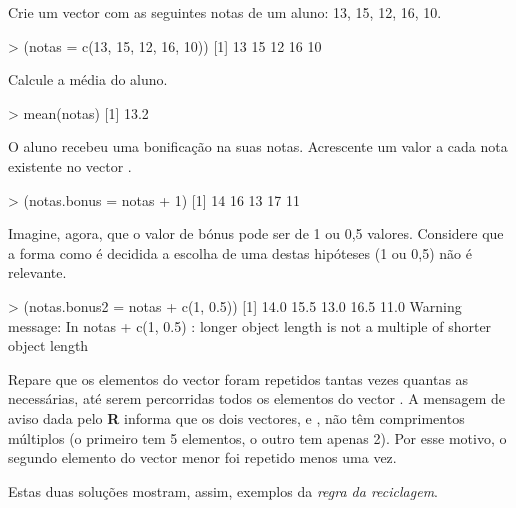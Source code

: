 \documentclass{exam}
\begin{document}
\begin{questions}

\question Crie um vector  com as seguintes notas de um aluno: 13, 15, 12, 16, 10.

\begin{solution}
	\begin{rcode}
		> (notas = c(13, 15, 12, 16, 10))
		[1] 13 15 12 16 10
	\end{rcode}
\end{solution}

\question Calcule a média do aluno.

\begin{solution}
	\begin{rcode}
		> mean(notas)
		[1] 13.2
	\end{rcode}
\end{solution}

\question O aluno recebeu uma bonificação na suas notas. Acrescente um valor a cada nota existente no vector .

\begin{solution}
	\begin{rcode}
		> (notas.bonus = notas + 1)
		[1] 14 16 13 17 11
	\end{rcode}
\end{solution}

\question Imagine, agora, que o valor de bónus pode ser de 1 ou 0,5 valores. Considere que a forma como é decidida a escolha de uma destas hipóteses (1 ou 0,5) não é relevante.

\begin{solution}
	\begin{rcode}
		> (notas.bonus2 = notas + c(1, 0.5))
		[1] 14.0 15.5 13.0 16.5 11.0
		Warning message:
		In notas + c(1, 0.5) :
		longer object length is not a multiple of shorter object length
	\end{rcode}
	Repare que os elementos do vector  foram repetidos tantas vezes quantas as necessárias, até serem percorridas todos os elementos do vector . A mensagem de aviso dada pelo \textbf{R} informa que os dois vectores,  e , não têm comprimentos múltiplos (o primeiro tem 5 elementos, o outro tem apenas 2). Por esse motivo, o segundo elemento do vector menor foi repetido menos uma vez.
	
	Estas duas soluções mostram, assim, exemplos da \textit{regra da reciclagem}.
\end{solution}


\end{questions}
\end{document}
